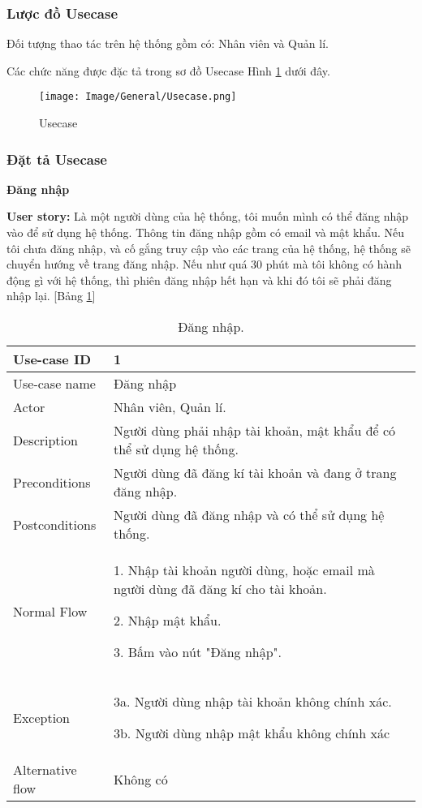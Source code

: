 \subsubsection{Lược đồ Usecase}
Đối tượng thao tác trên hệ thống gồm có: Nhân viên và Quản lí.\par
Các chức năng được đặc tả trong sơ đồ Usecase Hình \ref{usecase} dưới đây.

\begin{figure}[H]
    \begin{center}
        \texttt{[image: Image/General/Usecase.png]}
        \caption{Usecase}
        \label{usecase}
    \end{center}
\end{figure}

\subsubsection{Đặt tả Usecase}
\textbf{Đăng nhập}\par
\textbf{User story:} Là một người dùng của hệ thống, tôi muốn mình có thể đăng nhập vào để sử dụng hệ thống. Thông tin đăng nhập gồm có email và mật khẩu. Nếu tôi chưa đăng nhập, và cố gắng truy cập vào các trang của hệ thống, hệ thống sẽ chuyển hướng về trang đăng nhập. Nếu như quá 30 phút mà tôi không có hành động gì với hệ thống, thì phiên đăng nhập hết hạn và khi đó tôi sẽ phải đăng nhập lại. [Bảng \ref{bang1}]
\begin{table}[H]
    \centering
    \begin{tabular}{|m{3cm}|m{10cm}|}
    \hline 
        Use-case ID & 1\\ \hline
        Use-case name & Đăng nhập\\ \hline
        Actor & Nhân viên, Quản lí.\\ \hline
        Description & Người dùng phải nhập tài khoản, mật khẩu để có thể sử dụng hệ thống.\\ \hline
        Preconditions & Người dùng đã đăng kí tài khoản và đang ở trang đăng nhập.\\ \hline
        Postconditions & Người dùng đã đăng nhập và có thể sử dụng hệ thống.\\ \hline
        Normal Flow & 
        1. Nhập tài khoản người dùng, hoặc email mà người dùng đã đăng kí cho tài khoản.\par
        2. Nhập mật khẩu.\par
        3. Bấm vào nút "Đăng nhập".
        \\ \hline
        Exception & 
        3a. Người dùng nhập tài khoản không chính xác.\par
        3b. Người dùng nhập mật khẩu không chính xác
        \\ \hline
        Alternative flow & Không có\\ 
    \hline 
    \end{tabular}
    \caption{Đăng nhập.}
    \label{bang1}
\end{table}


